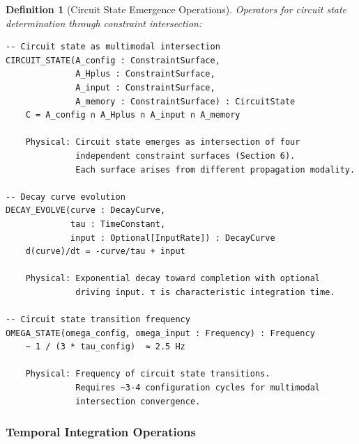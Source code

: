 \documentclass[aps,prd,twocolumn,superscriptaddress,floatfix,nofootinbib]{revtex4-2}
\newtheorem{definition}[theorem]{Definition}
\theoremstyle{remark}
\begin{document}
\begin{definition}[Circuit State Emergence Operations]
\label{def:consciousness_ops}
Operators for circuit state determination through constraint intersection:
\begin{verbatim}
-- Circuit state as multimodal intersection
CIRCUIT_STATE(A_config : ConstraintSurface,
              A_Hplus : ConstraintSurface,
              A_input : ConstraintSurface,
              A_memory : ConstraintSurface) : CircuitState
    C = A_config ∩ A_Hplus ∩ A_input ∩ A_memory
    
    Physical: Circuit state emerges as intersection of four
              independent constraint surfaces (Section 6).
              Each surface arises from different propagation modality.

-- Decay curve evolution
DECAY_EVOLVE(curve : DecayCurve,
             tau : TimeConstant,
             input : Optional[InputRate]) : DecayCurve
    d(curve)/dt = -curve/tau + input
    
    Physical: Exponential decay toward completion with optional
              driving input. τ is characteristic integration time.

-- Circuit state transition frequency
OMEGA_STATE(omega_config, omega_input : Frequency) : Frequency
    ~ 1 / (3 * tau_config)  ≈ 2.5 Hz
    
    Physical: Frequency of circuit state transitions.
              Requires ~3-4 configuration cycles for multimodal
              intersection convergence.
\end{verbatim}
\end{definition}

\subsubsection{Temporal Integration Operations}
\end{document}
